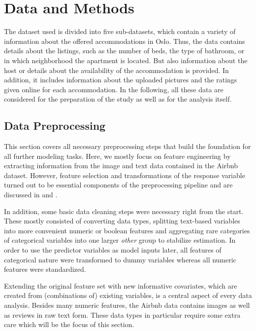 \section{Data and Methods}

The dataset used is divided into five sub-datasets, which contain a variety of information about the offered accommodations in Oslo. Thus, the data contains details about the listings, such as the number of beds, the type of bathroom, or in which neighborhood the apartment is located. But also information about the host or details about the availability of the accommodation is provided. 
In addition, it includes information about the uploaded pictures and the ratings given online for each accommodation. In the following, all these data are considered for the preparation of the study as well as for the analysis itself. 

\subsection{Data Preprocessing}

This section covers all necessary preprocessing steps that build the foundation for all further modeling tasks.
Here, we mostly focus on feature engineering by extracting information from the image and text data contained in the Airbnb dataset.
However, feature selection and transformations of the response variable turned out to be essential components of the preprocessing pipeline and are discussed in  and .

In addition, some basic data cleaning steps were necessary right from the start.
These mostly consisted of converting data types, splitting text-based variables into more convenient numeric or boolean features and aggregating rare categories of categorical variables into one larger \emph{other} group to stabilize estimation.
In order to use the predictor variables as model inputs later, all features of categorical nature were transformed to dummy variables whereas all numeric features were standardized.

Extending the original feature set with new informative covariates, which are created from (combinations of) existing variables, is a central aspect of every data analysis.
Besides many numeric features, the Airbnb data contains images as well as reviews in raw text form.
These data types in particular require some extra care which will be the focus of this section.

